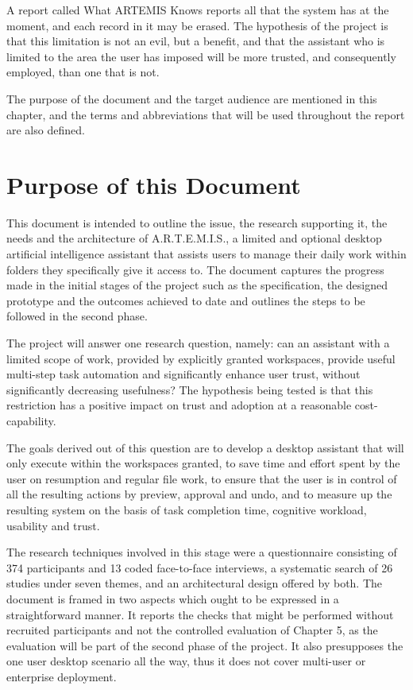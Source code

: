 \documentclass{FastFyp}
\begin{document}
A report called What ARTEMIS Knows reports all that the system has at the moment, and each record in it may be erased. The hypothesis of the project is that this limitation is not an evil, but a benefit, and that the assistant who is limited to the area the user has imposed will be more trusted, and consequently employed, than one that is not.


The purpose of the document and the target audience are mentioned in this chapter, and the terms and abbreviations that will be used throughout the report are also defined.

\section{Purpose of this Document}
This document is intended to outline the issue, the research supporting it, the needs and the architecture of A.R.T.E.M.I.S., a limited and optional desktop artificial intelligence assistant that assists users to manage their daily work within folders they specifically give it access to. The document captures the progress made in the initial stages of the project such as the specification, the designed prototype and the outcomes achieved to date and outlines the steps to be followed in the second phase.

The project will answer one research question, namely: can an assistant with a limited scope of work, provided by explicitly granted workspaces, provide useful multi-step task automation and significantly enhance user trust, without significantly decreasing usefulness? The hypothesis being tested is that this restriction has a positive impact on trust and adoption at a reasonable cost-capability.

The goals derived out of this question are to develop a desktop assistant that will only execute within the workspaces granted, to save time and effort spent by the user on resumption and regular file work, to ensure that the user is in control of all the resulting actions by preview, approval and undo, and to measure up the resulting system on the basis of task completion time, cognitive workload, usability and trust.

The research techniques involved in this stage were a questionnaire consisting of 374 participants and 13 coded face-to-face interviews, a systematic search of 26 studies under seven themes, and an architectural design offered by both. The document is framed in two aspects which ought to be expressed in a straightforward manner. It reports the checks that might be performed without recruited participants and not the controlled evaluation of Chapter 5, as the evaluation will be part of the second phase of the project. It also presupposes the one user desktop scenario all the way, thus it does not cover multi-user or enterprise deployment.
\end{document}
